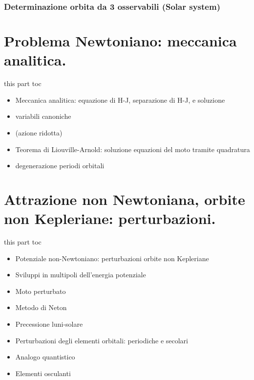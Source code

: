 \documentclass[10pt,xcolor={usenames},fleqn,mathserif,serif]{beamer}
\begin{document}


\section{Determinazione orbita da 3 osservabili (Solar system)}\label{sec:orbitobs}



\part{Problema Newtoniano: meccanica analitica.}\label{part:analytic}
\frame{\partpage}

\begin{frame}{this part toc}

\begin{itemize}

\item Meccanica analitica: equazione di H-J, separazione di H-J, e soluzione
\item variabili canoniche
\item (azione ridotta)
\item Teorema di Liouville-Arnold: soluzione equazioni del moto tramite quadratura
\item degenerazione periodi orbitali

\end{itemize}


\end{frame}



\part{Attrazione non Newtoniana, orbite non Kepleriane: perturbazioni.}\label{part:perturbation}
\frame{\partpage}

\begin{frame}{this part toc}

\begin{itemize}

\item Potenziale non-Newtoniano: perturbazioni orbite non Kepleriane
\item Sviluppi in multipoli dell'energia potenziale
\item Moto perturbato
\item Metodo di Neton
\item Precessione luni-solare
\item Perturbazioni degli elementi orbitali: periodiche e secolari
\item Analogo quantistico
\item Elementi osculanti

\end{itemize}

\end{frame} 
\end{document}
